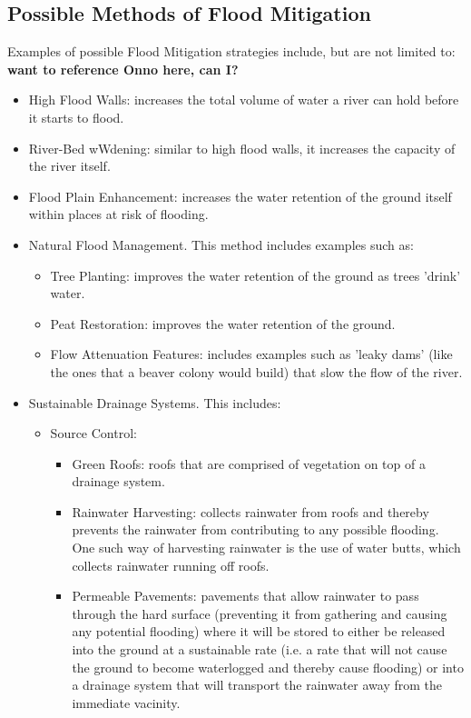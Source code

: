 \documentclass[11 pt, a4paper]{article}
\begin{document}
\subsection{Possible Methods of Flood Mitigation}
Examples of possible Flood Mitigation strategies include, but are not limited to:\\
\textbf{want to reference Onno here, can I?}
\begin{itemize}
\item High Flood Walls: increases the total volume of water a river can hold before it starts to flood.
\item River-Bed wWdening: similar to high flood walls, it increases the capacity of the river itself.
\item Flood Plain Enhancement: increases the water retention of the ground itself within places at risk of flooding.
\item Natural Flood Management. This method includes examples such as:
\begin{itemize}
\item Tree Planting:  improves the water retention of the ground as trees 'drink' water.
\item Peat Restoration: improves the water retention of the ground.
\item Flow Attenuation Features: includes examples such as 'leaky dams' (like the ones that a beaver colony would build) that slow the flow of the river.
\end{itemize}
\item Sustainable Drainage Systems. This includes: \cite{3}
\begin{itemize}
\item Source Control:
\begin{itemize}
\item Green Roofs: roofs that are comprised of vegetation on top of a drainage system.
\item Rainwater Harvesting: collects rainwater from roofs and thereby prevents the rainwater from contributing to any possible flooding. One such way of harvesting rainwater is the use of water butts, which collects rainwater running off roofs.
\item Permeable Pavements: pavements that allow rainwater to pass through the hard surface (preventing it from gathering and causing any potential flooding) where it will be stored to either be released into the ground at a sustainable rate (i.e. a rate that will not cause the ground to become waterlogged and thereby cause flooding) or into a drainage system that will transport the rainwater away from the immediate vacinity.

\end{itemize}
\end{itemize}
\end{itemize}
\end{document}
